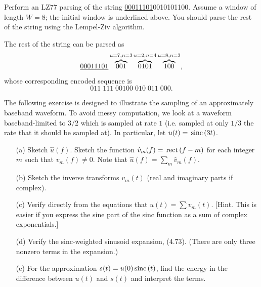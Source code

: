 \documentclass{assignment}
\begin{document}
\begin{prob}[2.33]
    Perform an LZ77 parsing of the string \uline{00011101}0010101100. Assume a window of length $W=8$; the initial window is underlined above. You should parse the rest of the string using the Lempel-Ziv algorithm.
\end{prob}
\begin{sol}
    The rest of the string can be parsed as
    \[
        \uline{00011101}\overbrace{001}^{u=7,n=3}\overbrace{0101}^{u=2,n=4}\overbrace{100}^{u=8,n=3},
    \]
    whose corresponding encoded sequence is
    \[
        011\;111\;00100\;010\;011\;000.
    \]
\end{sol}

\begin{prob}[4.35 Aliasing]
    The following exercise is designed to illustrate the sampling of an approximately baseband waveform. To avoid messy computation, we look at a waveform baseband-limited to $3/2$ which is sampled at rate $1$ (i.e. sampled at only $1/3$ the rate that it should be sampled at). In particular, let $u(t)=\,\text{sinc}\,(3t)$.
    \begin{itemize}
        \item[(a)] Sketch $\hat{u}(f)$. Sketch the function $\hat{v}_m(f)=\,\text{rect}\,(f-m)$ for each integer $m$ such that $v_m(f)\neq 0$. Note that $\hat{u}(f)=\sum_m\hat{v}_m(f)$.
        \item[(b)] Sketch the inverse transforms $v_m(t)$ (real and imaginary parts if complex).
        \item[(c)] Verify directly from the equations that $u(t)=\sum v_m(t)$. [Hint. This is easier if you express the sine part of the sinc function as a sum of complex exponentials.]
        \item[(d)] Verify the sinc-weighted sinusoid expansion, (4.73). (There are only three nonzero terms in the expansion.)
        \item[(e)] For the approximation $s(t)=u(0)\,\text{sinc}\,(t)$, find the energy in the difference between $u(t)$ and $s(t)$ and interpret the terms.
    \end{itemize}
\end{prob}
\end{document}
